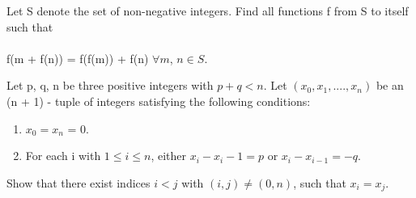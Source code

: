 \item Let S denote the set of non-negative integers. Find all functions f from S to itself such that\\
\\ f(m + f(n)) = f(f(m)) + f(n) $\forall m$, $n \in S$.\\

\item Let p, q, n be three positive integers with $p+q < n$. Let $(x_0, x_1, .... , x_n)$
be an (n + 1) - tuple of integers satisfying the following conditions:\\
\begin{enumerate}
\item $x_0 = x_n$ = 0.
\item For each i with $1 \leq i \leq n$, either $x_i - x_i-1 = p$ or $x_i - x_{i-1} = -q$.
\end{enumerate}
Show that there exist indices $i < j$ with $(i, j) \neq (0, n)$, such that
$x_i = x_j$.





